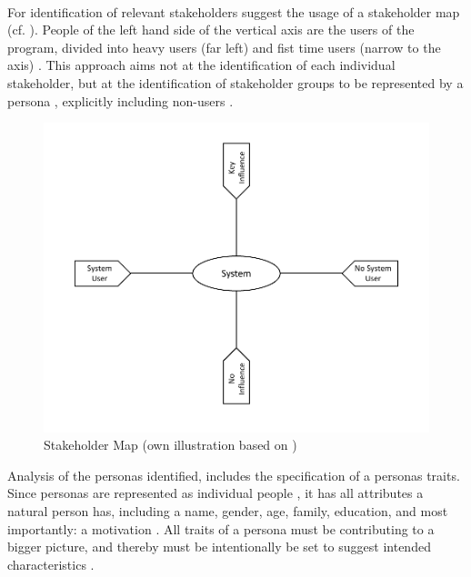 \paragraph{} For identification of relevant stakeholders \textcite[38]{Robier.2016} suggest the usage of a stakeholder map (cf. ). People of the left hand side of the vertical axis are the users of the program, divided into heavy users (far left) and fist time users (narrow to the axis) \parencite[cf.][38]{Robier.2016}. This approach aims not at the identification of each individual stakeholder, but at the identification of stakeholder groups to be represented by a persona \parencite[cf.][82]{Cooper.2007}, explicitly  including non-users \parencite[cf.][84]{Cooper.2007}.
\begin{figure}[H]
    \centering
    \includegraphics[scale=0.7]{img/stakeholderMap.pdf}
    \caption[Stakeholder Map]{Stakeholder Map (own illustration based on \cite[38]{Robier.2016})}
    \label{fig:stakeMap}
\end{figure}
Analysis of the personas identified, includes the specification of a personas traits. Since personas are represented as individual people \parencite[cf.][81]{Cooper.2007}, it has all attributes a natural person has, including a name, gender, age, family, education, and most importantly: a motivation \parencites[cf.][]{Platt.2016}[cf.][83-84]{Cooper.2007}. All traits of a persona must be contributing to a bigger picture, and thereby must be intentionally be set to suggest intended characteristics \parencite[cf.]{Platt.2016}. 
